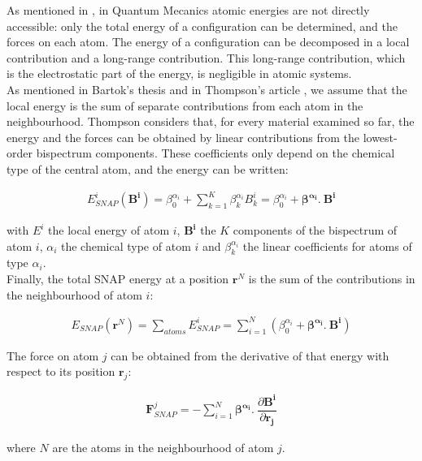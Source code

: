 \documentclass[12pt]{article}
\begin{document}
As mentioned in \cite{Bartok_01}, in Quantum Mecanics atomic energies are not directly accessible: only the total energy of a configuration can be determined, and the forces on each atom. The energy of a configuration can be decomposed in a local contribution and a long-range contribution. This long-range contribution, which is the electrostatic part of the energy, is negligible in atomic systems. \\
As mentioned in Bartok's thesis \cite{Bartok_01} and in Thompson's article \cite{Thompson_01}, we assume that the local energy is the sum of separate contributions from each atom in the neighbourhood. Thompson considers that, for every material examined so far, the energy and the forces can be obtained by linear contributions from the lowest-order bispectrum components. These coefficients only depend on the chemical type of the central atom, and the energy can be written: 

\begin{eqnarray} \label{eqn:energy}
E_{SNAP}^{i} \left(\boldsymbol{B^i}\right)=\beta_0^{\alpha_i}+\sum_{k=1}^K \beta_k^{\alpha_i} B_k^i=\beta_0^{\alpha_i}+\boldsymbol{\beta^{\alpha_i}}  \boldsymbol{. \ B^i}
\end{eqnarray}

with $E^i$ the local energy of atom $i$, $\boldsymbol{B^i}$ the $K$ components of the bispectrum of atom $i$, $\alpha_i$ the chemical type of atom $i$ and $\beta_k^{\alpha_i}$ the linear coefficients for atoms of type $\alpha_i$. \\

Finally, the total SNAP energy at a position $\boldsymbol{r}^N$ is the sum of the contributions in the neighbourhood of atom $i$: 

\begin{eqnarray} \label{totenergy}
E_{SNAP}\left(\boldsymbol{r}^N\right)=\sum_{atoms} E_{SNAP}^i=\sum_{i=1}^N \left( \beta_0^{\alpha_i}+\boldsymbol{\beta^{\alpha_i}}\boldsymbol{ . \ B^i}\right)
\end{eqnarray}

The force on atom $j$ can be obtained from the derivative of that energy with respect to its position $\boldsymbol{r}_j$:

\begin{eqnarray}
\boldsymbol{F}_{SNAP}^j=-\sum_{i=1}^N \boldsymbol{\beta^{\alpha_i} . \ }\dfrac{\partial \boldsymbol {B^i }}{\partial \boldsymbol{r_j}}
\end{eqnarray}

where $N$ are the atoms in the neighbourhood of atom $j$.
\end{document}
